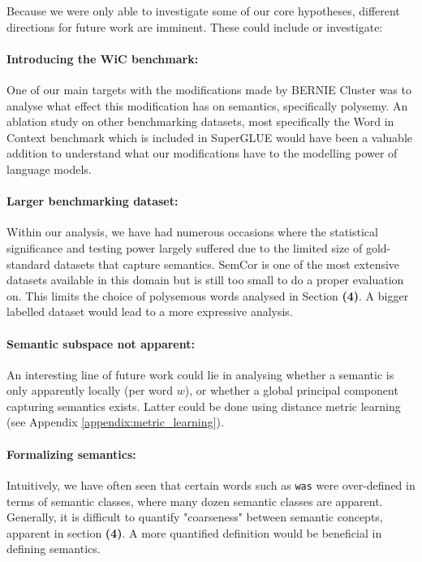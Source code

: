 \documentclass[a4paper,12pt,oneside,openright]{report}
\begin{document}
Because we were only able to investigate some of our core hypotheses, different directions for future work are imminent.
These could include or investigate:

\paragraph{Introducing the WiC benchmark:} One of our main targets with the modifications made by BERNIE Cluster was to analyse what effect this modification has on semantics, specifically polysemy.
An ablation study on other benchmarking datasets, most specifically the Word in Context benchmark which is included in SuperGLUE would have been a valuable addition to understand what our modifications have to the modelling power of language models.

\paragraph{Larger benchmarking dataset:} Within our analysis, we have had numerous occasions where the statistical significance and testing power largely suffered due to the limited size of gold-standard datasets that capture semantics.
SemCor is one of the most extensive datasets available in this domain but is still too small to do a proper evaluation on.
This limits the choice of polysemous words analysed in Section \textbf{(4)}.
A bigger labelled dataset would lead to a more expressive analysis.

\paragraph{Semantic subspace not apparent:} An interesting line of future work could lie in analysing whether a semantic is only apparently locally (per word $w$), or whether a global principal component capturing semantics exists.
Latter could be done using distance metric learning (see Appendix \ref{appendix:metric_learning}).

\paragraph{Formalizing semantics:}
Intuitively, we have often seen that certain words such as \texttt{was} were over-defined in terms of semantic classes, where many dozen semantic classes are apparent.
Generally, it is difficult to quantify "coarseness" between semantic concepts, apparent in section \textbf{(4)}.
A more quantified definition would be beneficial in defining semantics.
\end{document}
